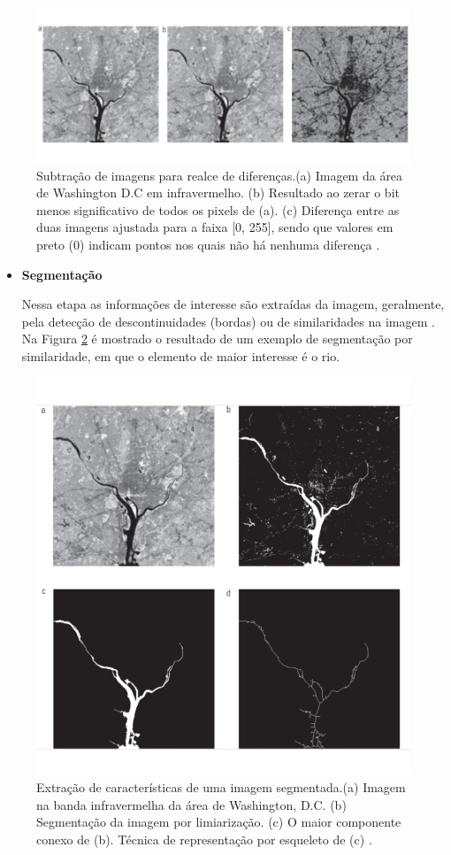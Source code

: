 \documentclass[
  brazilian,
]{book}
\begin{document}
\begin{figure}

{\centering \includegraphics[width=0.6\linewidth]{imagens/01-introducao/preProcessamento} 

}

\caption{Subtração de imagens para realce de diferenças.(a) Imagem da área de Washington D.C em infravermelho. (b) Resultado ao zerar o bit menos significativo de todos os pixels de (a). (c) Diferença entre as duas imagens ajustada para a faixa {[}0, 255{]}, sendo que valores em preto (0) indicam pontos nos quais não há nenhuma diferença \autocite[p.~49]{gonzalez2010}.}\label{fig:preProcessamento}
\end{figure}

\begin{itemize}
\item
  \textbf{Segmentação}

  Nessa etapa as informações de interesse são extraídas da imagem, geralmente, pela detecção de descontinuidades (bordas) ou de similaridades na imagem \autocite[p.~4]{pedrini2008}. Na Figura \ref{fig:segmentacao} é mostrado o resultado de um exemplo de segmentação por similaridade, em que o elemento de maior interesse é o rio.
\end{itemize}



\begin{figure}

{\centering \includegraphics[width=0.5\linewidth]{imagens/01-introducao/segmentacao} 

}

\caption{Extração de características de uma imagem segmentada.(a) Imagem na banda infravermelha da área de Washington, D.C. (b) Segmentação da imagem por limiarização. (c) O maior componente conexo de (b). Técnica de representação por esqueleto de (c) \autocite[p.~544]{gonzalez2010}.}\label{fig:segmentacao}
\end{figure}
\end{document}
